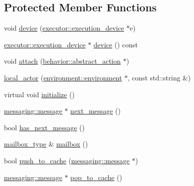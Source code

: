 \subsection*{Protected Member Functions}
\begin{DoxyCompactItemize}
\item 
void \hyperlink{classactor__zeta_1_1actor_1_1local__actor_a10630eb4ca5d3ef6722743422d6f8d67}{device} (\hyperlink{structactor__zeta_1_1executor_1_1execution__device}{executor\+::execution\+\_\+device} $\ast$e)
\item 
\hyperlink{structactor__zeta_1_1executor_1_1execution__device}{executor\+::execution\+\_\+device} $\ast$ \hyperlink{classactor__zeta_1_1actor_1_1local__actor_ab02f8bbd99a78b15564321336d9e9b59}{device} () const
\item 
void \hyperlink{classactor__zeta_1_1actor_1_1local__actor_a2a64a1b7c7d88cc1bb3b530edea07322}{attach} (\hyperlink{classactor__zeta_1_1behavior_1_1abstract__action}{behavior\+::abstract\+\_\+action} $\ast$)
\item 
\hyperlink{classactor__zeta_1_1actor_1_1local__actor_a10847f855f54d1dbc6f946c75b024cc7}{local\+\_\+actor} (\hyperlink{classactor__zeta_1_1environment_1_1environment}{environment\+::environment} $\ast$, const std\+::string \&)
\item 
virtual void \hyperlink{classactor__zeta_1_1actor_1_1local__actor_ab540625b83fa06318a2ae41dcca4ca16}{initialize} ()
\item 
\hyperlink{classactor__zeta_1_1messaging_1_1message}{messaging\+::message} $\ast$ \hyperlink{classactor__zeta_1_1actor_1_1local__actor_ab149db7088e5c9465c6ded44e47b720f}{next\+\_\+message} ()
\item 
bool \hyperlink{classactor__zeta_1_1actor_1_1local__actor_a48509fa451ade61c97fe65c895639548}{has\+\_\+next\+\_\+message} ()
\item 
\hyperlink{classactor__zeta_1_1actor_1_1local__actor_aacff3ec6e7196584dd640b8d57fa020e}{mailbox\+\_\+type} \& \hyperlink{classactor__zeta_1_1actor_1_1local__actor_afaa5f7042296f91cd741369df0e6585a}{mailbox} ()
\item 
bool \hyperlink{classactor__zeta_1_1actor_1_1local__actor_ae736971463581933ea4daa4958f3cd80}{push\+\_\+to\+\_\+cache} (\hyperlink{classactor__zeta_1_1messaging_1_1message}{messaging\+::message} $\ast$)
\item 
\hyperlink{classactor__zeta_1_1messaging_1_1message}{messaging\+::message} $\ast$ \hyperlink{classactor__zeta_1_1actor_1_1local__actor_a8e8dd70bea2c17895e8aca704e68806a}{pop\+\_\+to\+\_\+cache} ()
\end{DoxyCompactItemize}
